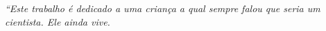 \begin{epigrafe}
	\vspace*{\fill}
	\begin{flushright}
		\textit{``Este trabalho é dedicado a uma criança a qual sempre falou que seria um cientista. Ele ainda vive.}
	\end{flushright}
\end{epigrafe}
